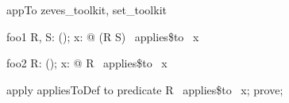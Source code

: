 
\begin{zsection}
 \SECTION appTo \parents zeves\_toolkit, set\_toolkit
\end{zsection}

\begin{theorem}{foo1}
   \forall R, S: \power(\nat \cross \nat); x: \nat @ (R \cup S) ~applies\$to~ x
\end{theorem}

\begin{theorem}{foo2}
   \forall R: \power(\nat \cross \nat); x: \nat @ R ~applies\$to~ x
\end{theorem}

\begin{zproof}[foo2]
   apply appliesToDef to predicate R ~applies\$to~ x;
   prove;
\end{zproof}
